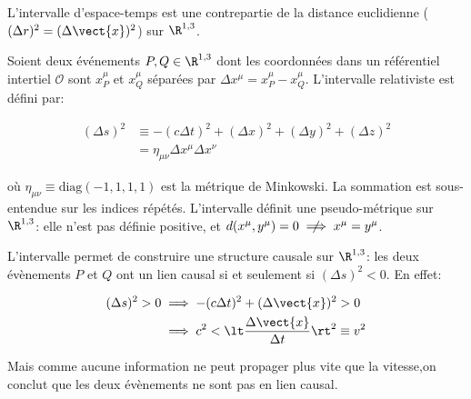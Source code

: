 L'intervalle d'espace-temps est une contrepartie de la distance euclidienne ($(\Delta r)^2 = (\Delta \vect{x})^2$) sur $\R^{1,3}$.

Soient deux événements $P,Q \in \R^{1,3}$ dont les coordonnées dans un référentiel intertiel $\mathcal{O}$ sont $x_P^{\mu}$ et $x_Q^{\mu}$ séparées par $\Delta x^{\mu}=x^\mu_P-x^\mu_Q$. L'intervalle relativiste est défini par:

\begin{align}
    (\Delta s)^2 &\equiv -(c\Delta t)^2 + (\Delta x)^2 + (\Delta y)^2 + (\Delta z)^2\\
    &= \eta _{\mu \nu} \Delta x^{\mu} \Delta x^{\nu}
\end{align}

où $\eta _{\mu \nu} \equiv \textrm{diag}(-1, 1, 1, 1)$ est la métrique de Minkowski. La sommation est sous-entendue sur les indices répétés. L'intervalle définit une pseudo-métrique sur $\R^{1,3}$: elle n'est pas définie positive, et $d(x^\mu,y^\mu)=0 \centernot \implies x^\mu=y^\mu$.

L'intervalle permet de construire une structure causale sur $\R^{1,3}$: les deux évènements $P$ et $Q$ ont un lien causal si et seulement si $(\Delta s)^2 < 0$. En effet:

\begin{align}
    (\Delta s)^2 > 0 &\implies -(c\Delta t)^2 + (\Delta \vect{x})^2 > 0\\
    &\implies c^2 < \lt \frac{\Delta \vect{x}}{\Delta t} \rt^2 \equiv v^2\\
\end{align}

Mais comme aucune information ne peut propager plus vite que la vitesse,on conclut que les deux évènements ne sont pas en lien causal. 

